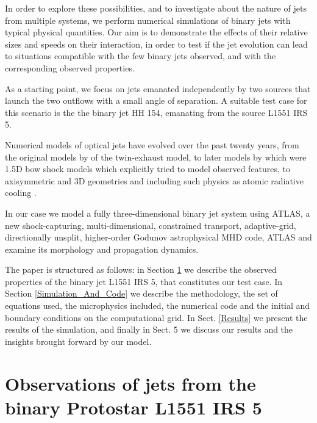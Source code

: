 \documentclass{aa}
\begin{document}
In order to explore these possibilities, and to investigate about the 
nature of jets from multiple systems, 
we perform numerical simulations of binary jets with typical physical quantities.
Our aim is to demonstrate the effects of their relative sizes and 
speeds on their interaction, in order to test if the jet evolution 
can lead to situations compatible with the few
binary jets observed, and with the corresponding observed properties.

As a starting point, we focus on jets emanated independently 
by two sources that launch the two outflows
with a small angle of separation.
A suitable test case for this scenario is the 
the binary jet HH 154, emanating from the source 
L1551 IRS 5.





Numerical models of optical jets have evolved over the past twenty years, from the original models by \citet{1981ApJ...247...52N} of the \citet{1974MNRAS.169..395B} twin-exhaust model,
to later models by
\citet{1984ApJ...276..560H,1987ApJ...316..323H,1988ApJ...326..323R} which were
1.5D bow shock models which explicitly tried to model observed features, to
axisymmetric and 3D geometries and including such physics as atomic radiative
cooling \citep{1990ApJ...360..370B,1998AJ....116.2943R,2000ApJ...540..192S,2000A&A...364..763R,2001A&A...367..959R}.

In our case we model a fully three-dimensional binary jet system using ATLAS, a new shock-capturing, multi-dimensional, constrained transport, adaptive-grid, directionally unsplit, higher-order Godunov astrophysical MHD code, ATLAS and examine its morphology and propagation dynamics.

The paper is structured as follows: in Section \ref{Observation_Section}
we describe the observed properties of the binary jet L1551 IRS 5, that 
constitutes our test case. 
In Section
\ref{Simulation_And_Code} we describe the methodology, the set of
equations used, the microphysics included, the numerical code 
and the initial and boundary conditions on the computational grid. 
In Sect.
\ref{Results} we present the results of the simulation, 
and 
finally in Sect. 5 we discuss our results and the insights brought forward by 
our model.

\section{Observations of jets from the binary Protostar L1551 IRS 5}
\label{Observation_Section}
 
\end{document}
